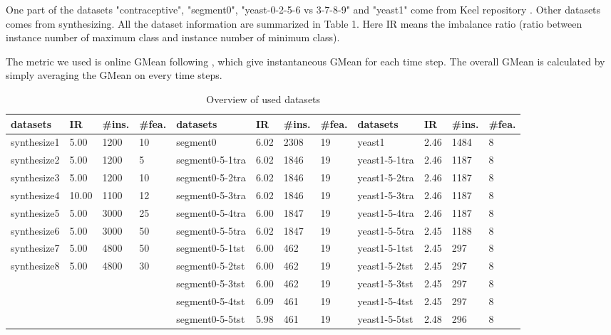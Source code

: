 \documentclass{article}
\begin{document}
One part of the datasets "contraceptive", "segment0", "yeast-0-2-5-6 vs 3-7-8-9" and "yeast1" come from Keel repository .
Other datasets comes from synthesizing. All the dataset information are summarized in Table 1. Here IR means the imbalance ratio (ratio between instance number of maximum class and instance number of minimum class).

The metric we used is online GMean following , which give instantaneous GMean for each time step. The overall GMean is calculated by simply averaging the GMean on every time steps.

\begin{table}[!ht] \tiny
	\centering
\begin{tabular}{|l||l|l|l||l||l|l|l||l||l|l|l|} 
	\hline
datasets    & IR    & \#ins. & \#fea. & datasets        & IR   & \#ins. & \#fea. & datasets      & IR   & \#ins. & \#fea. \\ \hline \hline
synthesize1 & 5.00  & 1200       & 10        & segment0        & 6.02 & 2308       & 19        & yeast1        & 2.46 & 1484       & 8         \\ \hline
synthesize2 & 5.00  & 1200       & 5         & segment0-5-1tra & 6.02 & 1846       & 19        & yeast1-5-1tra & 2.46 & 1187       & 8         \\ \hline
synthesize3 & 5.00  & 1200       & 10        & segment0-5-2tra & 6.02 & 1846       & 19        & yeast1-5-2tra & 2.46 & 1187       & 8         \\ \hline
synthesize4 & 10.00 & 1100       & 12        & segment0-5-3tra & 6.02 & 1846       & 19        & yeast1-5-3tra & 2.46 & 1187       & 8         \\ \hline
synthesize5 & 5.00  & 3000       & 25        & segment0-5-4tra & 6.00 & 1847       & 19        & yeast1-5-4tra & 2.46 & 1187       & 8         \\ \hline
synthesize6 & 5.00  & 3000       & 50        & segment0-5-5tra & 6.02 & 1847       & 19        & yeast1-5-5tra & 2.45 & 1188       & 8         \\ \hline
synthesize7 & 5.00  & 4800       & 50        & segment0-5-1tst & 6.00 & 462        & 19        & yeast1-5-1tst & 2.45 & 297        & 8         \\ \hline
synthesize8 & 5.00  & 4800       & 30        & segment0-5-2tst & 6.00 & 462        & 19        & yeast1-5-2tst & 2.45 & 297        & 8         \\ \hline
&       &            &           & segment0-5-3tst & 6.00 & 462        & 19        & yeast1-5-3tst & 2.45 & 297        & 8         \\ \hline
&       &            &           & segment0-5-4tst & 6.09 & 461        & 19        & yeast1-5-4tst & 2.45 & 297        & 8         \\ \hline
&       &            &           & segment0-5-5tst & 5.98 & 461        & 19        & yeast1-5-5tst & 2.48 & 296        & 8         \\ \hline
\end{tabular}
	\label{tab:overview}
	\caption{Overview of used datasets}
\end{table}
\end{document}
